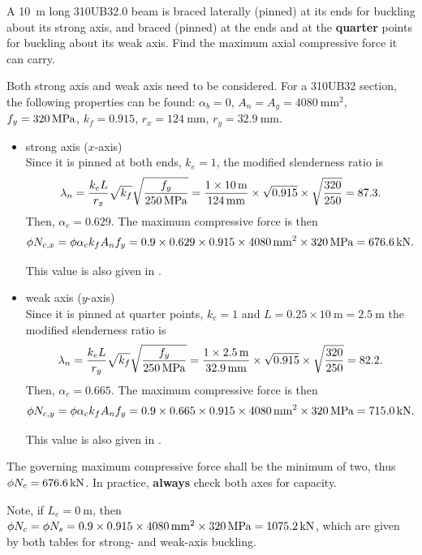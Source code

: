 \begin{exmp}
A \SI{10}{\meter} long 310UB32.0 beam is braced laterally (pinned) at its ends for buckling about its strong axis, and braced (pinned) at the ends and at the \textbf{quarter} points for buckling about its weak axis. Find the maximum axial compressive force it can carry.
\end{exmp}
\begin{solution}
Both strong axis and weak axis need to be considered. For a 310UB32 section, the following properties can be found: $\alpha_b=0$, $A_n=A_g=\SI{4080}{\mm^2}$, $f_y=\SI{320}{\mega\pascal}$, $k_f=0.915$, $r_x=\SI{124}{\mm}$, $r_y=\SI{32.9}{\mm}$.
\begin{itemize}
\item strong axis ($x$-axis)\\
Since it is pinned at both ends, $k_e=1$, the modified slenderness ratio is
\begin{gather*}
\lambda_n=\dfrac{k_eL}{r_x}\sqrt{k_f}\sqrt{\dfrac{f_y}{\SI{250}{\mega\pascal}}}=\dfrac{1\times\SI{10}{\meter}}{\SI{124}{\milli\meter}}\times\sqrt{0.915}\times\sqrt{\dfrac{320}{250}}=87.3.
\end{gather*}
Then, $\alpha_c=0.629$. The maximum compressive force is then
\begin{gather*}
\phi{}N_{c,x}=\phi\alpha_ck_fA_nf_y=0.9\times0.629\times0.915\times\SI{4080}{\milli\meter^2}\times\SI{320}{\mega\pascal}=\SI{676.6}{\kilo\newton}.
\end{gather*}

This value is also given in .
\item weak axis ($y$-axis)\\
Since it is pinned at quarter points, $k_e=1$ and $L=0.25\times\SI{10}{\meter}=\SI{2.5}{\meter}$ the modified slenderness ratio is
\begin{gather*}
\lambda_n=\dfrac{k_eL}{r_y}\sqrt{k_f}\sqrt{\dfrac{f_y}{\SI{250}{\mega\pascal}}}=\dfrac{1\times\SI{2.5}{\meter}}{\SI{32.9}{\milli\meter}}\times\sqrt{0.915}\times\sqrt{\dfrac{320}{250}}=82.2.
\end{gather*}
Then, $\alpha_c=0.665$. The maximum compressive force is then
\begin{gather*}
\phi{}N_{c,y}=\phi\alpha_ck_fA_nf_y=0.9\times0.665\times0.915\times\SI{4080}{\milli\meter^2}\times\SI{320}{\mega\pascal}=\SI{715.0}{\kilo\newton}.
\end{gather*}

This value is also given in .
\end{itemize}
The governing maximum compressive force shall be the minimum of two, thus $\phi{}N_c=\SI{676.6}{\kilo\newton}$. In practice, \textbf{always} check both axes for capacity.

Note, if $L_e=\SI{0}{\m}$, then $\phi{}N_c=\phi{}N_s=0.9\times0.915\times\SI{4080}{\milli\meter^2}\times\SI{320}{\mega\pascal}=\SI{1075.2}{\kilo\newton}$, which are given by both tables for strong- and weak-axis buckling.
\end{solution}
